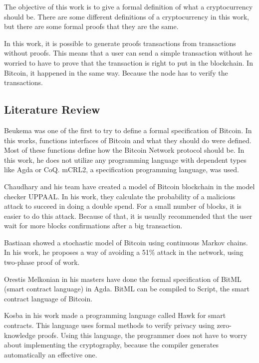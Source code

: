The objective of this work is to give a formal definition of what a cryptocurrency should be.
There are some different definitions of a cryptocurrency in this work,
but there are some formal proofs that they are the same.

In this work, it is possible to generate proofs transactions from transactions without proofs.
This means that a user can send a simple transaction without he worried to have to prove that
the transaction is right to put in the blockchain.
In Bitcoin, it happened in the same way.
Because the node has to verify the transactions.

\subsection{Literature Review}

Beukema \cite{beukema2014formalising} was one of the first to try
to define a formal specification of Bitcoin.
In this works, functions interfaces of Bitcoin and what they should do were defined.
Most of these functions define how the Bitcoin Network protocol should be.
In this work, he does not utilize any programming language with dependent types like Agda or CoQ.
mCRL2, a specification programming language, was used.

Chaudhary and his team \cite{chaudhary2015modeling} have created a model of Bitcoin blockchain
in the model checker UPPAAL.
In his work, they calculate the probability of a malicious attack to succeed in doing a double spend.
For a small number of blocks, it is easier to do this attack.
Because of that, it is usually recommended that the user wait for more blocks confirmations
after a big transaction.

Bastiaan \cite{bastiaan2015preventing} showed a stochastic model of Bitcoin using
continuous Markov chains.
In his work, he proposes a way of avoiding a 51\% attack in the network,
using two-phase proof of work.

Orestis Melkonian \cite{melkonian2019formalizing} in his masters have done the formal specification
of BitML (smart contract language) in Agda.
BitML can be compiled to Script, the smart contract language of Bitcoin. 

Kosba \cite{kosba2016hawk} in his work made a programming language called Hawk for smart contracts.
This language uses formal methods to verify privacy using zero-knowledge proofs.
Using this language, the programmer does not have to worry about implementing the cryptography,
because the compiler generates automatically an effective one.

